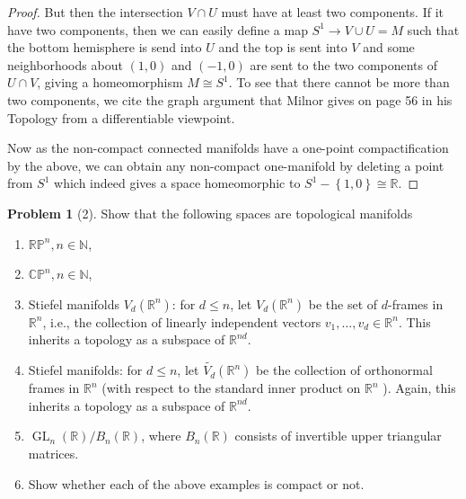\documentclass[reqno]{amsart}
\theoremstyle{definition}
\newtheorem{problem}[theorem]{Problem}
\theoremstyle{remark}
\DeclareMathOperator{\GL}{GL}
\begin{document}
\begin{proof}
    But then the intersection
    $V \cap U$ must have at least two components.
    If it have two components, then
    we can easily define a map
    $S^{1} \to V \cup  U = M$ such that the
    bottom hemisphere is send
    into $U$ and the top is sent into $V$ and
    some neighborhoods about $\left( 1,0 \right) $ and
    $\left( -1,0 \right) $ are sent to
    the two components of $U \cap V$, giving
    a homeomorphism $M \cong S^{1}$.
    To see that there cannot be more than two
    components, we cite the graph argument that Milnor gives
    on page 56 in his Topology from a differentiable viewpoint.

    Now as the non-compact connected manifolds
    have a one-point compactification by the above, we
    can obtain any non-compact one-manifold by
    deleting a point from $S^{1}$ which indeed
    gives a space homeomorphic to
    $S^{1} - \left\{ 1,0 \right\} \cong \mathbb{R}$.

\end{proof}

\begin{problem}[2]
    Show that the following spaces are topological manifolds
    \begin{enumerate}
        \item $\mathbb{R}\mathbb{P}^{n}, n \in \mathbb{N} $,
        \item $\mathbb{C}\mathbb{P}^{n}, n \in \mathbb{N} $,
        \item Stiefel manifolds $V_d \left( \mathbb{R}^{n} \right) $:
            for $d \le n$, let
            $V_d \left( \mathbb{R}^{n} \right) $ be the
            set of $d$-frames in $\mathbb{R}^{n}$, i.e.,
            the collection of linearly independent
            vectors $v_1, \ldots, v_d \in \mathbb{R}^{n}$.
            This inherits a topology as a subspace
            of $\mathbb{R}^{nd}$.
        \item Stiefel manifolds: for $d\le n$, let
            $\tilde{V_d}\left( \mathbb{R}^{n} \right) $ 
            be the collection of orthonormal frames in
            $\mathbb{R}^{n}$ (with respect to the standard
            inner product on $\mathbb{R}^{n}$ ). Again,
            this inherits a topology as a subspace of
            $\mathbb{R}^{nd}$.
        \item $\GL_n \left( \mathbb{R} \right) /
            B_n\left( \mathbb{R} \right) $, where
            $B_n(\mathbb{R})$ consists of invertible
            upper triangular matrices.
        \item Show whether each of the above examples is compact or not.
    \end{enumerate}
\end{problem}
\end{document}
